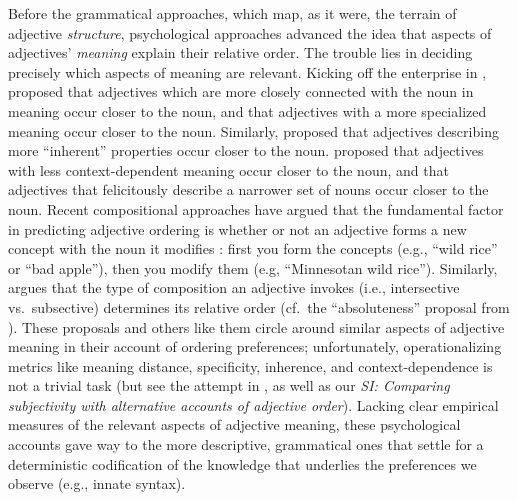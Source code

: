 \documentclass[12pt]{article}
\begin{document}
Before the grammatical approaches, which map, as it were, the terrain of adjective \emph{structure}, psychological approaches advanced the idea that aspects of adjectives' \emph{meaning} explain their relative order. The trouble lies in deciding precisely which aspects of meaning are relevant. 
Kicking off the enterprise in \citeyear{sweet1898}, \citeauthor{sweet1898} proposed that adjectives which are more closely connected with the noun in meaning occur closer to the noun, and that adjectives with a more specialized meaning occur closer to the noun. Similarly, \cite{whorf1945} proposed that adjectives describing more ``inherent'' properties occur closer to the noun. \cite{ziff1960} proposed that adjectives with less context-dependent meaning occur closer to the noun, and that adjectives that felicitously describe a narrower set of nouns occur closer to the noun. 
Recent compositional approaches have argued that the fundamental factor in predicting adjective ordering is whether or not an adjective forms a new concept with the noun it modifies \citep{McNally2004,svenonius2008}: first you form the concepts (e.g., ``wild rice'' or ``bad apple''), then you modify them (e.g, ``Minnesotan wild rice''). Similarly, \cite{truswell2009} argues that the type of composition an adjective invokes (i.e., intersective vs.~subsective) determines its relative order (cf.~the ``absoluteness'' proposal from \citealp{Sproat1991}). These proposals and others like them circle around similar aspects of adjective meaning in their account of ordering preferences; unfortunately, operationalizing metrics like meaning distance, specificity, inherence, and context-dependence is not a trivial task (but see the attempt in \citealp{martin1969}, as well as our \emph{SI: Comparing subjectivity with alternative accounts of adjective order}). 
Lacking clear empirical measures of the relevant aspects of adjective meaning, these psychological accounts gave way to the more descriptive, grammatical ones that settle for a deterministic codification of the knowledge that underlies the preferences we observe (e.g., innate syntax). 
\end{document}
